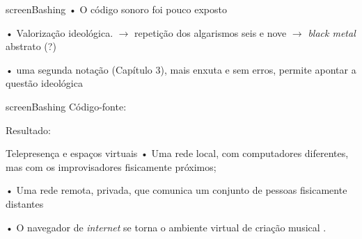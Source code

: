 \documentclass[aspectratio=169]{beamer}
\begin{document}
\begin{frame}{screenBashing}
• O código sonoro foi pouco exposto

• Valorização ideológica. $\rightarrow$ repetição dos algarismos seis e nove $\rightarrow$ \emph{black metal} abstrato (?) 

• uma segunda notação (Capítulo 3), mais enxuta e sem erros, permite apontar a questão ideológica
\end{frame}



\begin{frame}{screenBashing}
Código-fonte:

\magnoD

Resultado:

\magnoE
\end{frame}

\begin{frame}{Telepresença e espaços virtuais}
• Uma rede local, com computadores diferentes, mas com os improvisadores fisicamente próximos;

• Uma rede remota, privada, que comunica um conjunto de pessoas fisicamente distantes 

• O navegador de \emph{internet} se torna o ambiente virtual de criação musical \cite{roberts_web_2013}.
\end{frame}
\end{document}
